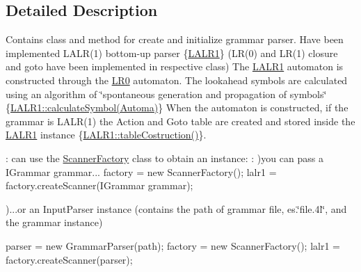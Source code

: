 \subsection{Detailed Description}
Contains class and method for create and initialize grammar parser. Have been implemented L\-A\-L\-R(1) bottom-\/up parser \{\hyperlink{classcontext_free_1_1scanner_1_1_l_a_l_r1}{L\-A\-L\-R1}\} (L\-R(0) and L\-R(1) closure and goto have been implemented in respective class) The \hyperlink{classcontext_free_1_1scanner_1_1_l_a_l_r1}{L\-A\-L\-R1} automaton is constructed through the \hyperlink{classcontext_free_1_1scanner_1_1_l_r0}{L\-R0} automaton. The lookahead symbols are calculated using an algorithm of \char`\"{}spontaneous generation and propagation of symbols\char`\"{} \{\hyperlink{classcontext_free_1_1scanner_1_1_l_a_l_r1_ab1c19e75693982310b7494bd3b8623c9}{L\-A\-L\-R1\-::calculate\-Symbol(\-Automa)}\} When the automaton is constructed, if the grammar is L\-A\-L\-R(1) the Action and Goto table are created and stored inside the \hyperlink{classcontext_free_1_1scanner_1_1_l_a_l_r1}{L\-A\-L\-R1} instance \{\hyperlink{classcontext_free_1_1scanner_1_1_l_a_l_r1_a92b63b5d61bbdd523a16aa5e577c2ba6}{L\-A\-L\-R1\-::table\-Costruction()}\}. \par
 \-:  can use the \hyperlink{classcontext_free_1_1scanner_1_1_scanner_factory}{Scanner\-Factory} class to obtain an instance\-: \-: )you can pass a I\-Grammar grammar...  factory = new Scanner\-Factory();  lalr1 = factory.\-create\-Scanner(\-I\-Grammar grammar); \par
 )...or an Input\-Parser instance (contains the path of grammar file, es.\char`\"{}file.\-4l\char`\"{}, and the grammar instance) \par
  parser = new Grammar\-Parser(path);  factory = new Scanner\-Factory();  lalr1 = factory.\-create\-Scanner(parser); 